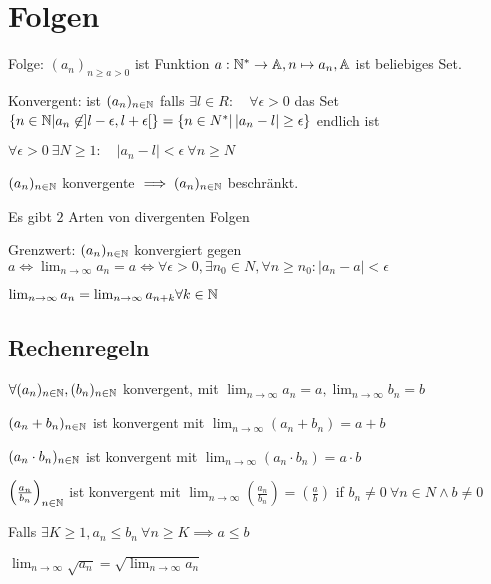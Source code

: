 
\section{Folgen}

\begin{compactdesc}
    \item[Folge:] $\left( a_n \right)_{n \ge a  > 0}$ ist Funktion $a:\mathbb{N}^* \to \mathbb{A}, n \mapsto a_n, \mathbb{A}$ ist beliebiges Set.
    \item[Konvergent:] ist $(a_n)_{n \in \mathbb{N}}$ falls $\exists l \in R: \quad \forall \epsilon > 0$ das Set $\left\{ n \in \mathbb{N} | a_n \not\in  ] l - \epsilon, l + \epsilon[ \right\} = \left\{ n \in N^* | \left| a_n - l \right| \ge \epsilon  \right\} $ endlich ist
        \begin{compactitem}
            \item $\forall  \epsilon > 0 \ \exists  N \ge 1: \quad |a_n - l| < \epsilon \ \forall n \ge N$
            \item $(a_n)_{n \in \mathbb{N}}$ konvergente $\implies (a_n)_{n \in \mathbb{N}}$ beschränkt.
            \item Es gibt $2$ Arten von divergenten Folgen
        \end{compactitem}
    \item[Grenzwert:] $(a_n)_{n \in \mathbb{N}}$ konvergiert gegen $a \iff \lim_{n \to \infty} a_n = a \iff \forall \epsilon > 0, \exists n_0 \in N, \forall n \ge n_0: \left| a_n - a \right| < \epsilon$
        \begin{compactitem}
            \item $\lim_{n \to \infty} a_n = \lim_{n \to \infty} a_{n+k} \forall k \in \mathbb{N} $
        \end{compactitem}
\end{compactdesc}

\subsection{Rechenregeln}
$\forall (a_n)_{n \in \mathbb{N}}, (b_n)_{n \in \mathbb{N}}$ konvergent, mit $\lim_{n \to \infty} a_n = a, \lim_{n \to \infty} b_n = b$
\begin{compactenum}
    \item $(a_n + b_n)_{n \in \mathbb{N}}$ ist konvergent mit $\lim_{n \to \infty} (a_n + b_n) = a + b$
    \item $(a_n \cdot  b_n)_{n \in \mathbb{N}}$ ist konvergent mit $\lim_{n \to \infty} (a_n \cdot  b_n) = a \cdot b$
    \item $\left( \frac{a_n}{b_n} \right) _{n \in \mathbb{N}}$ ist konvergent mit $\lim_{n \to \infty} \left( \frac{a_n}{b_n} \right) = \left( \frac{a}{b} \right)$ if $b_n \neq 0 \ \forall n \in N \wedge  b \neq 0$
    \item Falls $\exists K \ge 1, a_n \le  b_n \ \forall n \ge K \implies a \le b$
    \item $\lim_{n \to \infty} \sqrt{a_n} = \sqrt{\lim_{n \to \infty} a_n}$
\end{compactenum}

